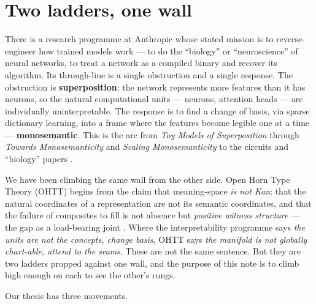 \documentclass[11pt,a4paper]{article}
\begin{document}
\tableofcontents
\clearpage

\section{Two ladders, one wall}

There is a research programme at Anthropic whose stated mission is to reverse-engineer how
trained models work --- to do the ``biology'' or ``neuroscience'' of neural networks, to
treat a network as a compiled binary and recover its algorithm. Its through-line is a single
obstruction and a single response. The obstruction is \textbf{superposition}: the network
represents more features than it has neurons, so the natural computational units --- neurons,
attention heads --- are individually uninterpretable. The response is to find a change of basis,
via sparse dictionary learning, into a frame where the features become legible one at a time
--- \textbf{monosemantic}. This is the arc from \emph{Toy Models of Superposition}
\cite{toymodels} through \emph{Towards Monosemanticity} \cite{towards} and \emph{Scaling
Monosemanticity} \cite{scaling} to the circuits and ``biology'' papers \cite{biology}.

We have been climbing the same wall from the other side. Open Horn Type Theory (OHTT) begins
from the claim that meaning-space \emph{is not Kan}: that the natural coordinates of a
representation are not its semantic coordinates, and that the failure of composites to fill is
not absence but \emph{positive witness structure} --- the gap as a load-bearing joint
\cite{rr,vessel}. Where the interpretability programme says \emph{the units are not the
concepts, change basis}, OHTT says \emph{the manifold is not globally chart-able, attend to the
seams}. These are not the same sentence. But they are two ladders propped against one wall, and
the purpose of this note is to climb high enough on each to see the other's rungs.

Our thesis has three movements.
\end{document}
